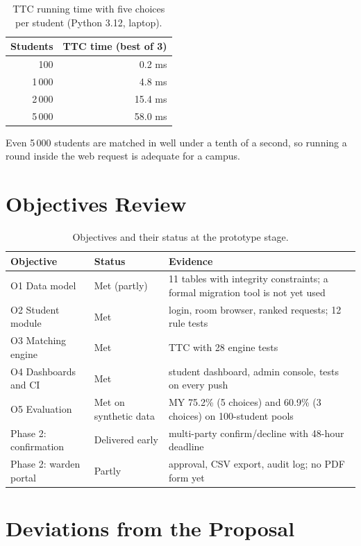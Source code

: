 \documentclass{tietreport}
\begin{document}
\begin{table}[H]
\centering
\begin{tabular}{@{}rr@{}}
\toprule
\textbf{Students} & \textbf{TTC time (best of 3)} \\
\midrule
100 & 0.2 ms \\
1\,000 & 4.8 ms \\
2\,000 & 15.4 ms \\
5\,000 & 58.0 ms \\
\bottomrule
\end{tabular}
\caption{TTC running time with five choices per student (Python 3.12, laptop).}
\end{table}

Even 5\,000 students are matched in well under a tenth of a second,
so running a round inside the web request is adequate for a campus.

\section{Objectives Review}

\begin{table}[H]
\centering
\begin{tabularx}{\textwidth}{@{}llL@{}}
\toprule
\textbf{Objective} & \textbf{Status} & \textbf{Evidence} \\
\midrule
O1 Data model & Met (partly) & 11 tables with integrity constraints; a formal migration tool is not yet used \\
O2 Student module & Met & login, room browser, ranked requests; 12 rule tests \\
O3 Matching engine & Met & TTC with 28 engine tests \\
O4 Dashboards and CI & Met & student dashboard, admin console, tests on every push \\
O5 Evaluation & Met on synthetic data & MY 75.2\% (5 choices) and 60.9\% (3 choices) on 100-student pools \\
Phase 2: confirmation & Delivered early & multi-party confirm/decline with 48-hour deadline \\
Phase 2: warden portal & Partly & approval, CSV export, audit log; no PDF form yet \\
\bottomrule
\end{tabularx}
\caption{Objectives and their status at the prototype stage.}
\end{table}

\section{Deviations from the Proposal}
\end{document}

